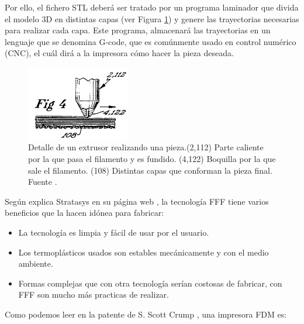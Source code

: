 Por ello, el fichero STL deberá ser tratado por un programa laminador que divida el modelo 3D en distintas capas (ver Figura \ref{fig:detalle_capas}) y genere las trayectorias necesarias para realizar cada capa. Este programa, almacenará las trayectorias en un lenguaje que se denomina G-code, que es comúnmente usado en control numérico (CNC), el cuál dirá a la impresora cómo hacer la pieza deseada.

\begin{figure}[h!]
    \centering
    \includegraphics[width=0.4\textwidth]{images/capas_fdm.png}
    \caption[Detalle  de un extrusor realizando una pieza.]{Detalle  de un extrusor realizando una pieza.(2,112) Parte caliente por la que pasa el filamento y es fundido. (4,122) Boquilla por la que sale el filamento. (108) Distintas capas que conforman la pieza final. Fuente \cite{crump1992apparatus}.}
    \label{fig:detalle_capas}
\end{figure}

Según explica Stratasys en su página web \cite{FDMTechnology}, la tecnología FFF tiene varios beneficios que la hacen idónea para fabricar:

\begin{itemize}
    \item La tecnología es limpia y fácil de usar por el usuario.
    \item Los termoplásticos usados son estables mecánicamente y con el medio ambiente.
    \item Formas complejas que con otra tecnología serían costosas de fabricar, con FFF son mucho más practicas de realizar.
\end{itemize}

Como podemos leer en la patente de S. Scott Crump \cite{crump1992apparatus}, una impresora FDM es:

